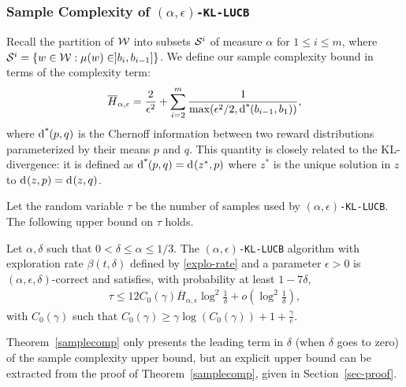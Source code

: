 \subsubsection{Sample Complexity of \texttt{$(\alpha,\epsilon)$-KL-LUCB}}

Recall the partition of $\mathcal{W}$ into subsets $\mathcal{S}^{i}$ of measure
$\alpha$ for $1 \le i \le m$,
where $\ArmGrp{i} = \Set{\arm \in \Arms:\ArmMean(\arm) \in ]b_i,b_{i-1}]}$.
We define our sample complexity bound in terms of the complexity
term:
%
\vspace{-15pt}
%
\begin{align}
\overline{H}_{\alpha,\epsilon} =
    \frac{ 2 }{ \epsilon^2 } +
    \sum_{ i = 2 }^{m}\frac{1}{
    \max(\epsilon^2/2,\operatorname{d^*}\hspace{-.2em}\left( b_{i-1}, b_1 \right))},
\end{align}
%
%
where $\operatorname{d^*}\hspace{-.2em}\left( p, q \right)$ is the Chernoff information
between two reward distributions parameterized by their means $p$ and $q$. This %
quantity is closely related to the KL-divergence: it is defined as 
$\operatorname{d^*}\hspace{-.2em}\left( p, q \right)=\operatorname{d}\hspace{-.1em}\left( z^*, p \right)$ where $z^*$ is the unique solution in $z$ to $\operatorname{d}\hspace{-.1em}\left( z, p \right) = \operatorname{d}\hspace{-.1em}\left( z, q \right)$. 

Let the random variable $\tau$ be the number of samples used by
\texttt{$(\alpha,\epsilon)$-KL-LUCB}. The following upper bound on $\tau$ holds.

\begin{theorem}\label{samplecomp}
Let $\alpha,\delta$ such that $0<\delta \leq \alpha \leq 1/3$.
The \texttt{$(\alpha,\epsilon)$-KL-LUCB} algorithm with exploration rate
$\beta(t,\delta)$ defined by \eqref{explo-rate} and a parameter $\epsilon>0$
is $(\alpha,\epsilon,\delta)$-correct and satisfies, with probability at least $1-7\delta$,
%
\vspace{-10pt}
%
\begin{align*}
    \tau \le 12 C_0(\gamma) \overline{H}_{\alpha,\epsilon}
    \log^2 \frac{1}{\delta} + o\left( \log^2 \frac{1}{\delta} \right),
\end{align*}
%
%
with $C_0(\gamma)$ such that
$C_0(\gamma) \ge \gamma \log(C_0(\gamma)) + 1 + \frac{\gamma}{e}$.
\end{theorem}

Theorem~\ref{samplecomp} only presents the leading term in $\delta$ (when $\delta$ goes to zero) of the sample complexity upper bound, but an explicit upper bound can be extracted from the proof of Theorem~\ref{samplecomp}, given in Section~\ref{sec-proof}.  

